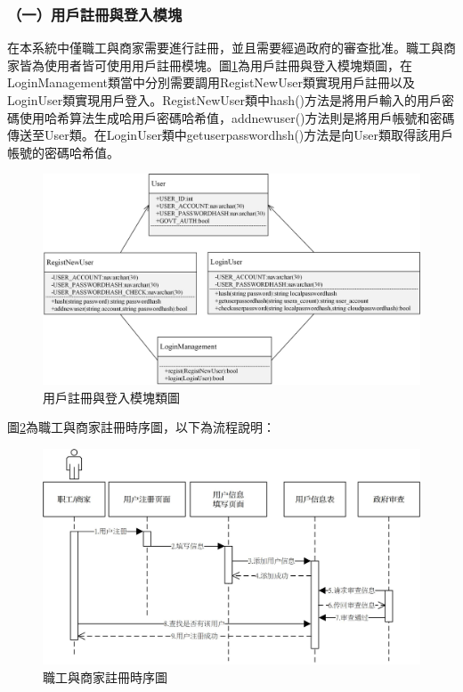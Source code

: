 \subsubsection{（一）用戶註冊與登入模塊}
在本系統中僅職工與商家需要進行註冊，並且需要經過政府的審查批准。職工與商家皆為使用者皆可使用用戶註冊模塊。圖\ref{c3}為用戶註冊與登入模塊類圖，在LoginManagement類當中分別需要調用RegistNewUser類實現用戶註冊以及LoginUser類實現用戶登入。RegistNewUser類中hash()方法是將用戶輸入的用戶密碼使用哈希算法生成哈用戶密碼哈希值，addnewuser()方法則是將用戶帳號和密碼傳送至User類。在LoginUser類中getuserpasswordhsh()方法是向User類取得該用戶帳號的密碼哈希值。

	\begin{figure}[htbp]
		\centering
		\includegraphics[width = 1\textwidth]{c3.jpg}
		\caption{用戶註冊與登入模塊類圖}\label{c3}
	\end{figure}

	圖\ref{time1}為職工與商家註冊時序圖，以下為流程說明：

	\begin{figure}[htbp]
		\centering
		\includegraphics[width = 1\textwidth]{time1.jpg}
		\caption{職工與商家註冊時序圖}\label{time1}
	\end{figure}

